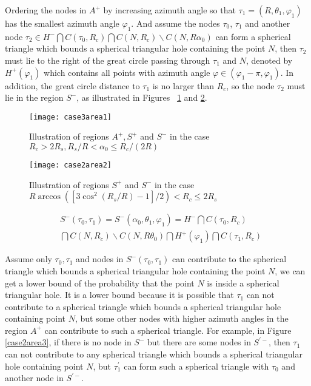\documentclass[journal, twoside]{IEEEtran}
\begin{document}
Ordering the nodes in $A^+$ by increasing azimuth angle so that $\tau_1 = (R, \theta_1, \varphi_1)$ 
has the smallest azimuth angle $\varphi_1$. And assume the nodes
$\tau_0$, $\tau_1$ and another node $\tau_2 \in H^- \bigcap C(\tau_0, R_c) \bigcap C(N, R_c)
\backslash C(N, R\alpha_0)$ can form a spherical triangle which bounds a spherical triangular hole containing
the point $N$, then $\tau_2$ must lie to the right of the great circle passing
through $\tau_1$ and $N$, denoted by $H^+(\varphi_1)$ which contains
all points with azimuth angle $\varphi \in (\varphi_1 - \pi, \varphi_1)$. In addition, the great circle
distance to $\tau_1$ is no larger than $R_c$, so the node $\tau_2$ must lie
in the region $S^-$, as illustrated in Figures ~\ref{case3area1} and \ref{case2area2}.

\begin{figure}[ht]
  \centering
  \texttt{[image: case3area1]}
  \caption{Illustration of regions $A^+, S^+$ and $S^-$ in the case $R_c > 2R_s, R_s/R < \alpha_0 \leq R_c/(2R)$ }
  \label{case3area1}
\end{figure}

\begin{figure}[ht]
  \centering
  \texttt{[image: case2area2]}
  \caption{Illustration of regions $S^+$ and $S^-$ in the case $R \arccos([3\cos^2(R_s/R)-1]/2) < R_c \leq 2R_s$ }
  \label{case2area2}
\end{figure}

\begin{displaymath}
  \begin{split}
    & S^-(\tau_0, \tau_1)  =  S^- (\alpha_0, \theta_1, \varphi_1) =  H^- \bigcap C(\tau_0, R_c)  \\
    & \bigcap C(N, R_c) \backslash C(N, R\theta_0) \bigcap H^+(\varphi_1)
    \bigcap C(\tau_1, R_c)
  \end{split}
\end{displaymath}

Assume only $\tau_0, \tau_1$ and nodes in $S^-(\tau_0, \tau_1)$ can
contribute to the spherical triangle which bounds a spherical triangular hole containing the
point $N$, we can get a lower bound of the probability that the
point $N$ is inside a spherical triangular hole. It is a lower bound because it is
possible that $\tau_1$ can not contribute to a spherical triangle which bounds a spherical  
triangular hole containing point $N$, but some other nodes with 
higher azimuth angles in the region $A^+$ can contribute to such a spherical triangle.
For example, in Figure \ref{case2area3}, if there is no node in $S^-$ but 
there are some nodes in $S^{\prime-}$, then $\tau_1$ can not contribute
to any spherical triangle which bounds a spherical triangular hole containing point $N$, but
$\tau_1^\prime$ can form such a spherical triangle with $\tau_0$ and another node in
$S^{\prime-}$.
\end{document}
